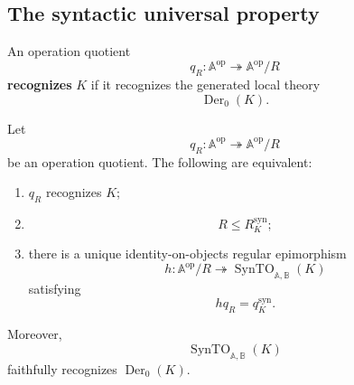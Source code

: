 \subsection{The syntactic universal property}
\label{subsec:to-syntactic-universal-property}

\begin{definition}
\label{def:to-recognition-specification}
    An operation quotient
    \[
        q_R:
        \mathbb A^{\mathrm{op}}
        \twoheadrightarrow
        \mathbb A^{\mathrm{op}}/R
    \]
    \textbf{recognizes} \(K\) if it recognizes the generated local theory
    \[
        \operatorname{Der}_0(K).
    \]
\end{definition}

\begin{theorem}
\label{thm:to-syntactic-universal-property}
    Let
    \[
        q_R:
        \mathbb A^{\mathrm{op}}
        \twoheadrightarrow
        \mathbb A^{\mathrm{op}}/R
    \]
    be an operation quotient. The following are equivalent:
    \begin{enumerate}
        \item \(q_R\) recognizes \(K\);
        \item
        \[
            R\leq R_K^{\mathrm{syn}};
        \]
        \item there is a unique identity-on-objects regular epimorphism
        \[
            h:
            \mathbb A^{\mathrm{op}}/R
            \twoheadrightarrow
            \operatorname{SynTO}_{\mathbb A,\mathbb B}(K)
        \]
        satisfying
        \[
            hq_R=q_K^{\mathrm{syn}}.
        \]
    \end{enumerate}

    Moreover,
    \[
        \operatorname{SynTO}_{\mathbb A,\mathbb B}(K)
    \]
    faithfully recognizes \(\operatorname{Der}_0(K)\).
\end{theorem}

